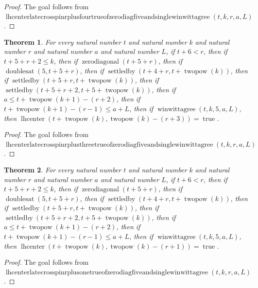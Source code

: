 \documentclass[11pt]{article}
\newtheorem{theorem}{Theorem}[section]
\theoremstyle{definition}
\begin{document}
\begin{proof}
The goal follows from \(\operatorname{lhcenterlatecrosspinrplusfourtrueofzerodiagfiveandsinglewinwittagree}(t, k, r, a, L)\).
\end{proof}
\begin{theorem}
\label{ll:paper:lhcenter-late-cross-pin-r-plus-three-true-of-zero-diag-five-and-single-winwittagree}
For every natural number \(t\) and natural number \(k\) and natural number \(r\) and natural number \(a\) and natural number \(L\), if \(t + 6 < r\), then if \(t + 5 + r + 2 \le k\), then if \(\operatorname{zerodiagonal}(t + 5 + r)\), then if \(\operatorname{doublesat}(5, t + 5 + r)\), then if \(\operatorname{settledby}(t + 4 + r, t + \operatorname{twopow}(k))\), then if \(\operatorname{settledby}(t + 5 + r, t + \operatorname{twopow}(k))\), then if \(\operatorname{settledby}(t + 5 + r + 2, t + 5 + \operatorname{twopow}(k))\), then if \(a \le t + \operatorname{twopow}(k + 1) - (r + 2)\), then if \(t + \operatorname{twopow}(k + 1) - (r - 1) \le a + L\), then if \(\operatorname{winwittagree}(t, k, 5, a, L)\), then \(\operatorname{lhcenter}(t + \operatorname{twopow}(k), \operatorname{twopow}(k) - (r + 3)) = \operatorname{true}\).
\end{theorem}
\begin{proof}
The goal follows from \(\operatorname{lhcenterlatecrosspinrplusthreetrueofzerodiagfiveandsinglewinwittagree}(t, k, r, a, L)\).
\end{proof}
\begin{theorem}
\label{ll:paper:lhcenter-late-cross-pin-r-plus-one-true-of-zero-diag-five-and-single-winwittagree}
For every natural number \(t\) and natural number \(k\) and natural number \(r\) and natural number \(a\) and natural number \(L\), if \(t + 6 < r\), then if \(t + 5 + r + 2 \le k\), then if \(\operatorname{zerodiagonal}(t + 5 + r)\), then if \(\operatorname{doublesat}(5, t + 5 + r)\), then if \(\operatorname{settledby}(t + 4 + r, t + \operatorname{twopow}(k))\), then if \(\operatorname{settledby}(t + 5 + r, t + \operatorname{twopow}(k))\), then if \(\operatorname{settledby}(t + 5 + r + 2, t + 5 + \operatorname{twopow}(k))\), then if \(a \le t + \operatorname{twopow}(k + 1) - (r + 2)\), then if \(t + \operatorname{twopow}(k + 1) - (r - 1) \le a + L\), then if \(\operatorname{winwittagree}(t, k, 5, a, L)\), then \(\operatorname{lhcenter}(t + \operatorname{twopow}(k), \operatorname{twopow}(k) - (r + 1)) = \operatorname{true}\).
\end{theorem}
\begin{proof}
The goal follows from \(\operatorname{lhcenterlatecrosspinrplusonetrueofzerodiagfiveandsinglewinwittagree}(t, k, r, a, L)\).
\end{proof}
\end{document}
